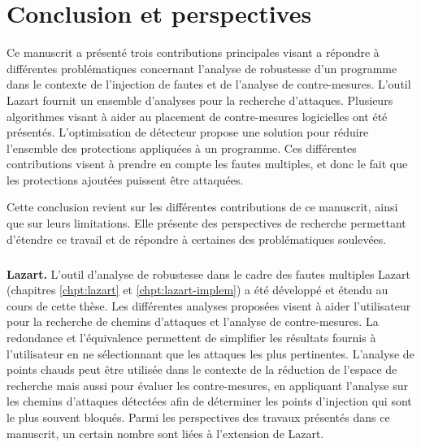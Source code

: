 \chapter{Conclusion et perspectives}
\label{chpt:future-works}

    Ce manuscrit a présenté trois contributions principales visant a répondre à différentes problématiques concernant l'analyse de robustesse d'un programme dans le contexte de l'injection de fautes et de l'analyse de contre-mesures.
    L'outil Lazart fournit un ensemble d'analyses pour la recherche d'attaques.     
    Plusieurs algorithmes visant à aider au placement de contre-mesures logicielles ont été présentés.
    L'optimisation de détecteur propose une solution pour réduire l'ensemble des protections appliquées à un programme.
    Ces différentes contributions visent à prendre en compte les fautes multiples, et donc le fait que les protections ajoutées puissent être attaquées.

    Cette conclusion revient sur les différentes contributions de ce manuscrit, ainsi que sur leurs limitations. Elle présente des perspectives de recherche permettant d'étendre ce travail et de répondre à certaines des problématiques soulevées. 

    \paragraph{}
    \textbf{Lazart.} L'outil d'analyse de robustesse dans le cadre des fautes multiples Lazart (chapitres \ref{chpt:lazart} et \ref{chpt:lazart-implem}) a été développé et étendu au cours de cette thèse.
    Les différentes analyses proposées visent à aider l'utilisateur pour la recherche de chemins d'attaques et l'analyse de contre-mesures.
    La redondance et l'équivalence permettent de simplifier les résultats fournis à l'utilisateur en ne sélectionnant que les attaques les plus pertinentes. 
    L'analyse de points chauds peut être utilisée dans le contexte de la réduction de l'espace de recherche mais aussi pour évaluer les contre-mesures, en appliquant l'analyse sur les chemins d'attaques détectées afin de déterminer les points d'injection qui sont le plus souvent bloqués.     
    Parmi les perspectives des travaux présentés dans ce manuscrit, un certain nombre sont liées à l'extension de Lazart. 

